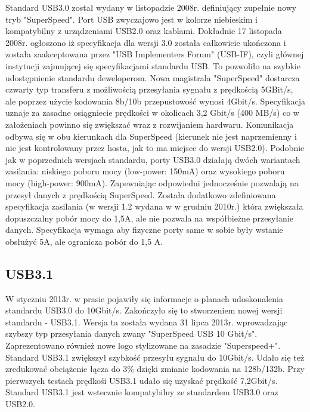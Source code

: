 \documentclass{BscUS}
\begin{document}
Standard USB3.0 został wydany w listopadzie 2008r. definiujący zupełnie nowy tryb "SuperSpeed". Port USB zwyczajowo jest w kolorze niebieskim i kompatybilny z urządzeniami USB2.0 oraz kablami.
\newline
Dokładnie 17 listopada 2008r. ogłoszono iż specyfikacja dla wersji 3.0 została całkowicie ukończona i została zaakceptowana przez "USB Implementers Forum" (USB-IF), czyli głównej instytucji zajmującej się specyfikacjami standardu USB. To pozwoliło na szybkie udostępnienie standardu deweloperom.
\newline
Nowa magistrala "SuperSpeed" dostarcza czwarty typ transferu z możliwością przesyłania sygnału z prędkością 5GBit/s, ale poprzez użycie kodowania 8b/10b przepustowość wynosi 4Gbit/s. Specyfikacja uznaje za zasadne osiągniecie prędkości w okolicach 3,2 Gbit/s (400 MB/s) co w założeniach powinno się zwiększać wraz z rozwijaniem hardwaru. Komunikacja odbywa się w obu kierunkach dla SuperSpeed (kierunek nie jest naprzemienny i nie jest kontrolowany przez hosta, jak to ma miejsce do wersji USB2.0).
\newline
Podobnie jak w poprzednich wersjach standardu, porty USB3.0 działają dwóch wariantach zasilania: niskiego poboru mocy (low-power: 150mA) oraz wysokiego poboru mocy (high-power: 900mA). Zapewniając odpowiedni jednocześnie pozwalają na przesył danych z prędkością SuperSpeed.
\newline
Została dodatkowo zdefiniowana specyfikacja zasilania (w wersji 1.2 wydana w w grudniu 2010r.) która zwiększała dopuszczalny pobór mocy do 1,5A, ale nie pozwala na współbieżne przesyłanie danych. Specyfikacja wymaga aby fizyczne porty same w sobie były wstanie obsłużyć 5A, ale ogranicza pobór do 1,5 A.

\subsection{USB3.1}
W styczniu 2013r. w prasie pojawiły się informacje o planach udoskonalenia standardu USB3.0 do 10Gbit/s. Zakończyło się to stworzeniem nowej wersji standardu - USB3.1. Wersja ta została wydana 31 lipca 2013r. wprowadzając szybszy typ przesyłania danych zwany "SuperSpeed USB 10 Gbit/s". Zaprezentowano również nowe logo stylizowane na zasadzie "Superspeed+". Standard USB3.1 zwiększył szybkość przesyłu sygnału do 10Gbit/s. Udało się też zredukować obciążenie łącza do 3\% dzięki zmianie kodowania na 128b/132b.
\newline
Przy pierwszych testach prędkośi USB3.1 udało się uzyskać prędkość 7,2Gbit/s.
\newline
Standard USB3.1 jest wstecznie kompatybilny ze standardem USB3.0 oraz USB2.0.
\end{document}
